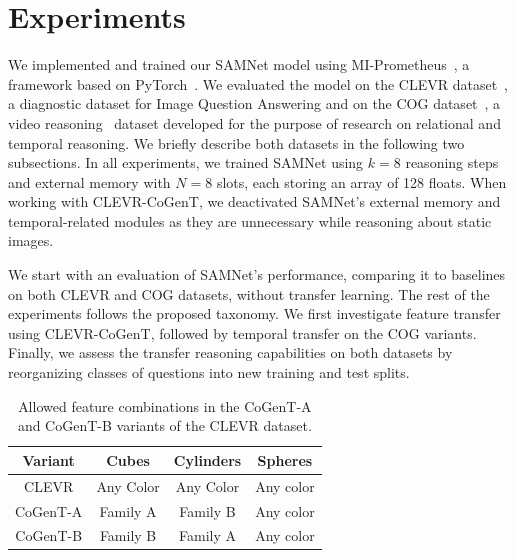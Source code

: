 \section{Experiments}
\label{sec:experiments}

We implemented and trained our SAMNet model using MI-Prometheus~\cite{kornuta2018accelerating}, a framework based on PyTorch~\cite{paszke2017automatic}.
We evaluated the model on
the CLEVR dataset~\cite{johnson2017clevr}, a diagnostic dataset for Image Question Answering and on the COG dataset~\cite{yang2018dataset}, a video reasoning~\cite{mogadala2019trends} dataset developed for the purpose of research on relational and temporal reasoning.
We briefly describe both datasets in the following two subsections.
In all experiments, we trained SAMNet using $k = 8$ reasoning steps and external memory with $N = 8$ slots, each storing an array of 128 floats.
When working with CLEVR-CoGenT, we deactivated SAMNet's external memory and temporal-related modules as they are unnecessary while reasoning about static images.

We start with an evaluation of SAMNet's performance, comparing it to baselines on both CLEVR and COG datasets, without transfer learning.
The rest of the experiments follows the proposed taxonomy.
We first investigate feature transfer using CLEVR-CoGenT, followed by temporal transfer on the COG variants. Finally, we assess the transfer reasoning capabilities on both datasets by reorganizing classes of questions into new training and test splits.

\begin{table}[b!]
	\centering
	\begin{tabular}{cccc}
		\toprule
		Variant	& Cubes	& Cylinders &	Spheres	\\
		\midrule
		CLEVR &  Any Color  & Any Color 	&	Any color  \\
		CoGenT-A &  Family A  & Family B 	&	Any color  \\
		CoGenT-B	&	Family B  &	Family A	&	Any color \\
		\bottomrule
	\end{tabular}
	\caption{Allowed feature combinations in the CoGenT-A and CoGenT-B variants of the CLEVR dataset.}%
	\label{tab:cogent_conditions}
\end{table}

